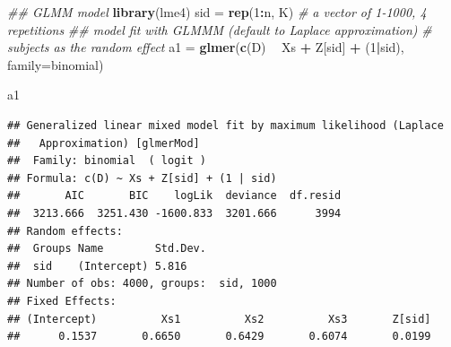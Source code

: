 \documentclass[]{book}
\newenvironment{Shaded}{\begin{snugshade}}{\end{snugshade}}
\newcommand{\CommentTok}[1]{\textcolor[rgb]{0.56,0.35,0.01}{\textit{#1}}}
\newcommand{\DataTypeTok}[1]{\textcolor[rgb]{0.13,0.29,0.53}{#1}}
\newcommand{\DecValTok}[1]{\textcolor[rgb]{0.00,0.00,0.81}{#1}}
\newcommand{\KeywordTok}[1]{\textcolor[rgb]{0.13,0.29,0.53}{\textbf{#1}}}
\newcommand{\NormalTok}[1]{#1}
\newcommand{\OperatorTok}[1]{\textcolor[rgb]{0.81,0.36,0.00}{\textbf{#1}}}
\newcommand{\StringTok}[1]{\textcolor[rgb]{0.31,0.60,0.02}{#1}}
\begin{document}
\begin{Shaded}
\begin{Highlighting}[]
\CommentTok{## GLMM model}
\KeywordTok{library}\NormalTok{(lme4)}
\NormalTok{sid =}\StringTok{ }\KeywordTok{rep}\NormalTok{(}\DecValTok{1}\OperatorTok{:}\NormalTok{n, K) }\CommentTok{# a vector of 1-1000, 4 repetitions}
\CommentTok{## model fit with GLMMM (default to Laplace approximation)}
\CommentTok{# subjects as the random effect}
\NormalTok{a1 =}\StringTok{ }\KeywordTok{glmer}\NormalTok{(}\KeywordTok{c}\NormalTok{(D) }\OperatorTok{~}\StringTok{ }\NormalTok{Xs }\OperatorTok{+}\StringTok{ }\NormalTok{Z[sid] }\OperatorTok{+}\StringTok{ }\NormalTok{(}\DecValTok{1}\OperatorTok{|}\NormalTok{sid), }\DataTypeTok{family=}\NormalTok{binomial)}

\NormalTok{a1}
\end{Highlighting}
\end{Shaded}

\begin{verbatim}
## Generalized linear mixed model fit by maximum likelihood (Laplace
##   Approximation) [glmerMod]
##  Family: binomial  ( logit )
## Formula: c(D) ~ Xs + Z[sid] + (1 | sid)
##       AIC       BIC    logLik  deviance  df.resid 
##  3213.666  3251.430 -1600.833  3201.666      3994 
## Random effects:
##  Groups Name        Std.Dev.
##  sid    (Intercept) 5.816   
## Number of obs: 4000, groups:  sid, 1000
## Fixed Effects:
## (Intercept)          Xs1          Xs2          Xs3       Z[sid]  
##      0.1537       0.6650       0.6429       0.6074       0.0199
\end{verbatim}
\end{document}
